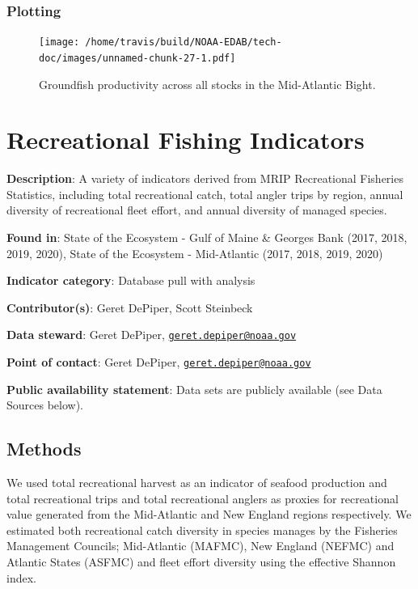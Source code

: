 \documentclass[
]{book}
\begin{document}
\hypertarget{plotting-21}{%
\subsection{Plotting}\label{plotting-21}}

\begin{figure}
\centering
\texttt{[image: /home/travis/build/NOAA-EDAB/tech-doc/images/unnamed-chunk-27-1.pdf]}
\caption{\label{fig:unnamed-chunk-27}Groundfish productivity across all stocks in the Mid-Atlantic Bight.}
\end{figure}

\hypertarget{recreational-fishing-indicators}{%
\chapter{Recreational Fishing Indicators}\label{recreational-fishing-indicators}}

\textbf{Description}: A variety of indicators derived from MRIP Recreational Fisheries Statistics, including total recreational catch, total angler trips by region, annual diversity of recreational fleet effort, and annual diversity of managed species.

\textbf{Found in}: State of the Ecosystem - Gulf of Maine \& Georges Bank (2017, 2018, 2019, 2020), State of the Ecosystem - Mid-Atlantic (2017, 2018, 2019, 2020)

\textbf{Indicator category}: Database pull with analysis

\textbf{Contributor(s)}: Geret DePiper, Scott Steinbeck

\textbf{Data steward}: Geret DePiper, \href{mailto:geret.depiper@noaa.gov}{\nolinkurl{geret.depiper@noaa.gov}}

\textbf{Point of contact}: Geret DePiper, \href{mailto:geret.depiper@noaa.gov}{\nolinkurl{geret.depiper@noaa.gov}}

\textbf{Public availability statement}: Data sets are publicly available (see Data Sources below).

\hypertarget{methods-29}{%
\section{Methods}\label{methods-29}}

We used total recreational harvest as an indicator of seafood production and total recreational trips and total recreational anglers as proxies for recreational value generated from the Mid-Atlantic and New England regions respectively. We estimated both recreational catch diversity in species manages by the Fisheries Management Councils; Mid-Atlantic (MAFMC), New England (NEFMC) and Atlantic States (ASFMC) and fleet effort diversity using the effective Shannon index.
\end{document}
